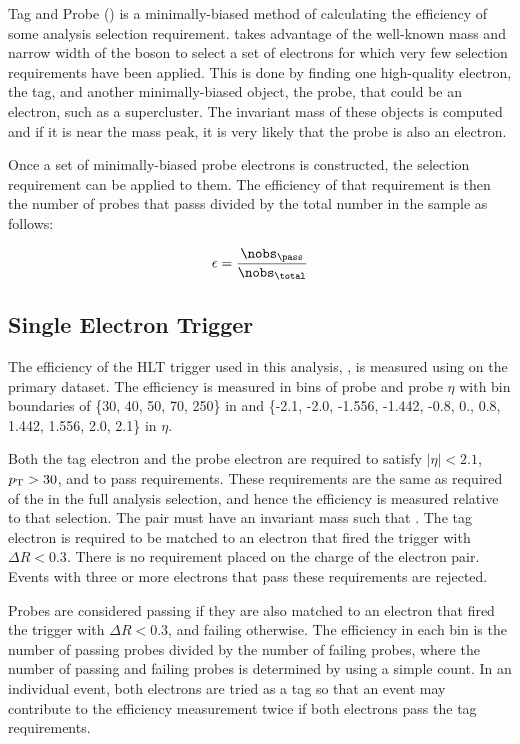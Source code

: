 Tag and Probe (\TnP) is a minimally-biased method of calculating the efficiency
of some analysis selection requirement. \TnP takes advantage of the well-known
mass and narrow width of the \Z boson to select a set of electrons for which
very few selection requirements have been applied. This is done by finding one
high-quality electron, the tag, and another minimally-biased object, the probe,
that could be an electron, such as a supercluster. The invariant mass of these
objects is computed and if it is near the \Z mass peak, it is very likely that
the probe is also an electron.

Once a set of minimally-biased probe electrons is constructed, the selection
requirement can be applied to them. The efficiency of that requirement is then
the number of probes that passs divided by the total number in the sample as
follows:

\begin{equation}
    \label{eq:eff}
    \eff = \frac{\nobs_{\pass}}{\nobs_{\total}}
\end{equation}

\subsection{Single Electron Trigger}
\label{ssec:sf_trigger}

The efficiency of the HLT trigger used in this analysis,
\SingleElectronTrigger, is measured using \TnP on the primary dataset. The
efficiency is measured in bins of probe \pt and probe $\eta$ with bin
boundaries of \{30, 40, 50, 70, 250\} in \pt and \{-2.1, -2.0, -1.556, -1.442,
-0.8, 0., 0.8, 1.442, 1.556, 2.0, 2.1\} in $\eta$.

Both the tag electron and the probe electron are required to satisfy $|\eta| <
2.1$, $p_{\mathrm{T}} > 30$, and to pass \EGTIGHT requirements. These requirements are the
same as required of the \CentralElectron in the full analysis selection, and
hence the efficiency is measured relative to that selection. The pair must have
an invariant mass such that \MassRange. The tag electron is required to be
matched to an electron that fired the trigger with $\Delta R < 0.3$. There is
no requirement placed on the charge of the electron pair. Events with three or
more electrons that pass these requirements are rejected.

Probes are considered passing if they are also matched to an electron that
fired the trigger with $\Delta R < 0.3$, and failing otherwise. The efficiency
in each bin is the number of passing probes divided by the number of failing
probes, where the number of passing and failing probes is determined by using a
simple count. In an individual event, both electrons are tried as a tag so that
an event may contribute to the efficiency measurement twice if both electrons
pass the tag requirements.

